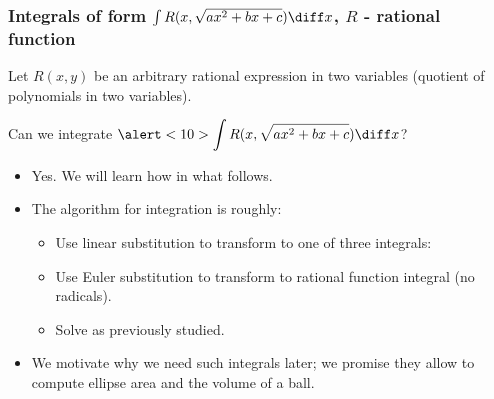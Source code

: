 \begin{frame}
\frametitle{Integrals of form $\int R(x,\sqrt{ax^2+bx+c}) \diff x$, $R$ - rational function}
Let $R(x,y)$ be an arbitrary rational expression in two variables (quotient of polynomials in two variables).
\begin{question}
Can we integrate $\alert<10>{\displaystyle\int R(x,\sqrt{ax^2+bx+c})\diff x}$?
\end{question}
\begin{itemize}
\item<2-> Yes. We will learn how in what follows.
\item<3-> The algorithm for integration is roughly:
\begin{itemize}
\item<4-> Use linear substitution to transform to one of three integrals: 
  
\item<8-> Use Euler substitution to transform to rational function integral (no radicals).
\item<9-> Solve as previously studied.
\end{itemize}
\item<10,11-> We motivate why we need \alert<10>{such integrals later}; we promise they allow to compute ellipse area and the volume of a ball.
\end{itemize}

\end{frame}
